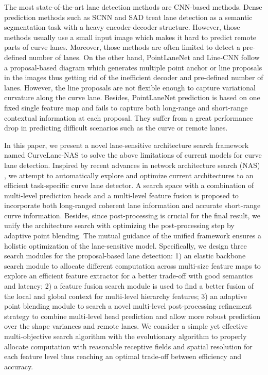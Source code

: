 \documentclass[runningheads]{llncs}
\begin{document}
The most state-of-the-art lane detection methods are CNN-based methods.
Dense prediction methods such as SCNN \cite{pan2018spatial} and SAD
\cite{hou2019learning} treat lane detection as a semantic segmentation
task with a heavy encoder-decoder structure. However, those methods
usually use a small input image which makes it hard to predict remote
parts of curve lanes. Moreover, those methods are often limited to
detect a pre-defined number of lanes. On the other hand, PointLaneNet
\cite{chen2019pointlanenet} and Line-CNN \cite{li2019line} follow
a proposal-based diagram which generates multiple point anchor or
line proposals in the images thus getting rid of the inefficient decoder
and pre-defined number of lanes. However, the line proposals are not
flexible enough to capture variational curvature along the curve lane.
Besides, PointLaneNet \cite{chen2019pointlanenet} prediction is based
on one fixed single feature map and fails to capture both long-range
and short-range contextual information at each proposal. They suffer
from a great performance drop in predicting difficult scenarios such
as the curve or remote lanes.

In this paper, we present a novel lane-sensitive architecture search
framework named CurveLane-NAS to solve the above limitations of current
models for curve lane detection. Inspired by recent advances in network
architecture search (NAS) \cite{zoph2018learning,liu2018progressive,liu2018darts,real2019regularized,tan2019efficientnet,chen2018searching,liu2019auto},
we attempt to automatically explore and optimize current architectures
to an efficient task-specific curve lane detector. A search space
with a combination of multi-level prediction heads and a multi-level
feature fusion is proposed to incorporate both long-ranged coherent
lane information and accurate short-range curve information. Besides,
since post-processing is crucial for the final result, we unify the
architecture search with optimizing the post-processing step by adaptive
point blending. The mutual guidance of the unified framework ensures
a holistic optimization of the lane-sensitive model. Specifically,
we design three search modules for the proposal-based lane detection:
1) an elastic backbone search module to allocate different computation
across multi-size feature maps to explore an efficient feature extractor
for a better trade-off with good semantics and latency; 2) a feature
fusion search module is used to find a better fusion of the local
and global context for multi-level hierarchy features; 3) an adaptive
point blending module to search a novel multi-level post-processing
refinement strategy to combine multi-level head prediction and allow
more robust prediction over the shape variances and remote lanes.
We consider a simple yet effective multi-objective search algorithm
with the evolutionary algorithm to properly allocate computation with reasonable receptive fields and spatial
resolution for each feature level thus reaching an optimal trade-off
between efficiency and accuracy. 
\end{document}
